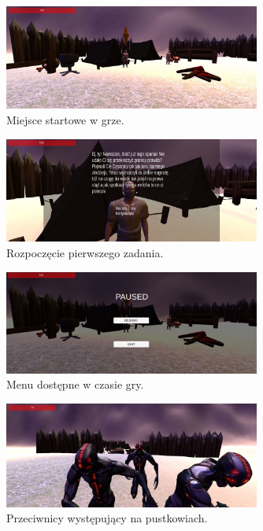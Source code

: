 \documentclass[10pt,a4paper]{article}
\begin{document}
\begin{figure}[ht!]
\begin{center}
\includegraphics[width=0.75\textwidth]{pictures/StartGame.jpg}
\end{center}
\caption{Miejsce startowe w grze.}
\end{figure}

\begin{figure}[ht!]
\begin{center}
\includegraphics[width=0.75\textwidth]{pictures/StoryWindow.jpg}
\end{center}
\caption{Rozpoczęcie pierwszego zadania.}
\end{figure}

\begin{figure}[ht!]
\begin{center}
\includegraphics[width=0.75\textwidth]{pictures/MenuInGame.jpg}
\end{center}
\caption{Menu dostępne w czasie gry.}
\end{figure}

\begin{figure}[ht!]
\begin{center}
\includegraphics[width=0.75\textwidth]{pictures/FightWithOpponents.jpg}
\end{center}
\caption{Przeciwnicy występujący na pustkowiach.}
\end{figure}
\end{document}
